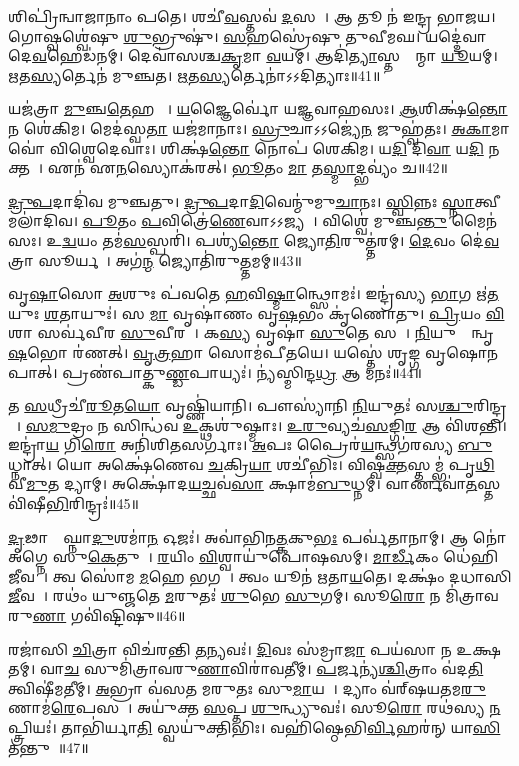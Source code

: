 𑌶𑌿𑌪𑍍𑌰𑌿॑𑌨𑍍𑌵𑌾𑌜𑌾𑌨𑌾𑌂 𑌪𑌤𑍇।
𑌶𑌚𑍀॑\ul{𑌵}𑌸𑍍𑌤𑌵॑ \ul{𑌦}\ul{}𑌸𑌨𑌾᳚।
𑌆 𑌤𑍂 𑌨॑ 𑌇𑌨𑍍𑌦𑍍𑌰 𑌭𑌾𑌜𑌯।
𑌗𑍋𑌷𑍍𑌵𑌶𑍍𑌵𑍇॑𑌷𑍁 \ul{𑌶𑍁}𑌭𑍍𑌰𑍁𑌷𑍁॑।
\ul{𑌸}𑌹𑌸𑍍𑌰𑍇॑𑌷𑍁 𑌤𑍁𑌵𑍀𑌮𑌘।
𑌯𑌦𑍍𑌦𑍇॑𑌵𑌾 𑌦𑍇\ul{𑌵}𑌹𑍇𑌡॑𑌨𑌮𑍍।
𑌦𑍇𑌵𑌾॑𑌸𑌶𑍍𑌚\ul{𑌕𑍃}𑌮𑌾 \ul{𑌵}𑌯𑌮𑍍।
𑌆𑌦𑌿॑\ul{𑌤𑍍𑌯𑌾}𑌸𑍍𑌤𑌸𑍍𑌮𑌾᳚𑌨𑍍𑌮𑌾 \ul{𑌯𑍂}𑌯𑌮𑍍।
\ul{𑌋}𑌤\ul{𑌸𑍍𑌯}𑌰𑍍𑌤𑍇𑌨॑ 𑌮𑍁𑌞𑍍𑌚𑌤।
\ul{𑌋}𑌤\ul{𑌸𑍍𑌯}𑌰𑍍𑌤𑍇𑌨𑌾॑𑌽𑌽𑌦𑌿𑌤𑍍𑌯𑌾𑌃॥41॥

𑌯𑌜॑𑌤𑍍𑌰𑌾 \ul{𑌮𑍁}𑌞𑍍𑌚\ul{𑌤𑍇}𑌹 𑌮𑌾᳚।
\ul{𑌯}𑌜𑍍𑌞𑍈𑌰𑍍𑌵𑍋॑ 𑌯𑌜𑍍𑌞𑌵𑌾𑌹𑌸𑌃।
\ul{𑌆}𑌶𑌿𑌕𑍍𑌷॑\ul{𑌨𑍍𑌤𑍋} 𑌨 𑌶𑍇॑𑌕𑌿𑌮।
𑌮𑍇𑌦॑𑌸𑍍𑌵\ul{𑌤𑌾} 𑌯𑌜॑𑌮𑌾𑌨𑌾𑌃।
\ul{𑌸𑍍𑌰𑍁}𑌚𑌾\-𑌽𑌽𑌜𑍍𑌯𑍇॑\ul{𑌨} 𑌜𑍁𑌹𑍍𑌵॑𑌤𑌃।
\ul{𑌅}\ul{𑌕𑌾}𑌮𑌾 𑌵𑍋॑ 𑌵𑌿𑌶𑍍𑌵𑍇𑌦𑍇𑌵𑌾𑌃।
𑌶𑌿𑌕𑍍𑌷॑\ul{𑌨𑍍𑌤𑍋} 𑌨𑍋𑌪॑ 𑌶𑍇𑌕𑌿𑌮।
𑌯\ul{𑌦𑌿} 𑌦𑌿\ul{𑌵𑌾} 𑌯\ul{𑌦𑌿} 𑌨𑌕𑍍𑌤𑌮𑍍᳚।
𑌏𑌨॑ 𑌏\ul{𑌨}𑌸𑍍𑌯𑍋𑌕॑𑌰𑌤𑍍।
\ul{𑌭𑍂}𑌤𑌂 \ul{𑌮𑌾} 𑌤\ul{𑌸𑍍𑌮𑌾}𑌦𑍍𑌭𑌵𑍍𑌯𑌂॑ 𑌚॥42॥

\ul{𑌦𑍍𑌰𑍁}\ul{𑌪}𑌦𑌾𑌦𑌿॑𑌵 𑌮𑍁𑌞𑍍𑌚𑌤𑍁।
\ul{𑌦𑍍𑌰𑍁}\ul{𑌪}𑌦𑌾\ul{𑌦𑌿}𑌵𑍇𑌨𑍍𑌮𑍁॑𑌮𑍁\ul{𑌚𑌾}𑌨𑌃।
\ul{𑌸𑍍𑌵𑌿}𑌨𑍍𑌨𑌃 \ul{𑌸𑍍𑌨𑌾}𑌤𑍍𑌵𑍀 𑌮𑌲𑌾॑𑌦𑌿𑌵।
\ul{𑌪𑍂}𑌤𑌂 \ul{𑌪}𑌵𑌿𑌤𑍍𑌰𑍇॑\ul{𑌣𑍇}𑌵𑌾𑌽𑌽𑌜𑍍𑌯𑌮𑍍᳚।
𑌵𑌿𑌶𑍍𑌵𑍇॑ 𑌮𑍁𑌞𑍍𑌚\ul{𑌨𑍍𑌤𑍁} 𑌮𑍈𑌨॑𑌸𑌃।
𑌉\ul{𑌦𑍍𑌵}𑌯𑌂 𑌤𑌮॑\ul{𑌸}𑌸𑍍𑌪𑌰𑌿॑।
𑌪𑌶𑍍𑌯॑\ul{𑌨𑍍𑌤𑍋} 𑌜𑍍𑌯𑍋\ul{𑌤𑌿}𑌰𑍁𑌤𑍍𑌤॑𑌰𑌮𑍍।
\ul{𑌦𑍇}𑌵𑌂 𑌦𑍇॑\ul{𑌵}𑌤𑍍𑌰𑌾 𑌸𑍂𑌰𑍍𑌯𑌮𑍍᳚।
𑌅𑌗॑\ul{𑌨𑍍𑌮} 𑌜𑍍𑌯𑍋𑌤𑌿॑𑌰𑍁\ul{𑌤𑍍𑌤}𑌮𑌮𑍍॥43॥\anuvakamend[𑌤𑌵॑ 𑌕𑍃\ul{𑌧𑌿} 𑌵\ul{𑌨}𑌸𑍍𑌪𑌤𑍀᳚𑌞𑍍𑌜𑌾𑌨\ul{𑌤𑌾}𑌮𑌸॑𑌤𑌿 \ul{𑌵}𑌯𑌂 𑌭॑𑌰𑌾𑌦𑌿𑌤𑍍𑌯𑌾\ul{𑌶𑍍𑌚} 𑌨𑌵॑ 𑌚]

𑌵𑍃\ul{𑌷𑌾}𑌸𑍋 \ul{𑌅}\ul{}𑌶𑍁𑌃 𑌪॑𑌵𑌤𑍇 \ul{𑌹}𑌵𑌿\ul{𑌷𑍍𑌮𑌾}𑌨𑍍𑌥𑍍𑌸𑍋𑌮𑌃॑।
𑌇𑌨𑍍𑌦𑍍𑌰॑𑌸𑍍𑌯 \ul{𑌭𑌾}𑌗 𑌋॑\ul{𑌤}𑌯𑍁𑌃 \ul{𑌶}𑌤𑌾𑌯𑍁𑌃॑।
𑌸 \ul{𑌮𑌾} 𑌵𑍃𑌷𑌾॑𑌣𑌂 𑌵𑍃\ul{𑌷}𑌭𑌂 𑌕𑍃॑𑌣𑍋𑌤𑍁।
\ul{𑌪𑍍𑌰𑌿}𑌯𑌂 \ul{𑌵𑌿}𑌶𑌾 𑌸𑌰𑍍𑌵॑𑌵𑍀𑌰 \ul{𑌸𑍁}𑌵𑍀𑌰𑌮𑍍᳚।
𑌕\ul{𑌸𑍍𑌯} 𑌵𑍃𑌷𑌾॑ \ul{𑌸𑍁}𑌤𑍇 𑌸𑌚𑌾᳚।
\ul{𑌨𑌿}𑌯𑍁𑌤𑍍𑌵𑌾᳚𑌨𑍍𑌵𑍃\ul{𑌷}𑌭𑍋 𑌰॑𑌣𑌤𑍍।
\ul{𑌵𑍃}\ul{𑌤𑍍𑌰}𑌹𑌾 𑌸𑍋𑌮॑𑌪𑍀𑌤𑌯𑍇।
𑌯𑌸𑍍𑌤𑍇॑ 𑌶𑍃𑌙𑍍𑌗 𑌵𑍃𑌷𑍋𑌨𑌪𑌾𑌤𑍍।
𑌪𑍍𑌰𑌣॑𑌪𑌾𑌤𑍍𑌕𑍁\ul{𑌣𑍍𑌡}𑌪𑌾𑌯𑍍𑌯𑌃॑।
𑌨𑍍𑌯॑𑌸𑍍𑌮𑌿𑌨𑍍𑌦\ul{𑌧𑍍𑌰} 𑌆 𑌮𑌨𑌃॑॥44॥

𑌤 \ul{𑌸}𑌧𑍍𑌰𑍀𑌚𑍀॑\ul{𑌰𑍂}𑌤\ul{𑌯𑍋} 𑌵𑍃𑌷𑍍𑌣𑌿॑𑌯𑌾𑌨𑌿।
𑌪𑍗𑌸𑍍𑌯𑌾॑𑌨𑌿 \ul{𑌨𑌿}𑌯𑍁𑌤𑌃॑ 𑌸\ul{𑌶𑍍𑌚𑍁}𑌰𑌿𑌨𑍍𑌦𑍍𑌰𑌮𑍍᳚।
\ul{𑌸}\ul{𑌮𑍁}𑌦𑍍𑌰𑌂 𑌨 𑌸𑌿𑌨𑍍𑌧॑𑌵 \ul{𑌉}𑌕𑍍𑌥𑌶𑍁॑𑌷𑍍𑌮𑌾𑌃।
\ul{𑌉}\ul{𑌰𑍁}𑌵𑍍𑌯𑌚॑\ul{𑌸}𑌙𑍍𑌗𑌿\ul{𑌰} 𑌆 𑌵𑌿॑𑌶𑌨𑍍𑌤𑌿।
𑌇𑌨𑍍𑌦𑍍𑌰𑌾॑\ul{𑌯} 𑌗𑌿\ul{𑌰𑍋} 𑌅𑌨𑌿॑𑌶𑌿𑌤𑌸𑌰𑍍𑌗𑌾𑌃।
\ul{𑌅}𑌪𑌃 𑌪𑍍𑌰𑍈𑌰॑\ul{𑌯}𑌨𑍍𑌥𑍍𑌸𑌗॑𑌰𑌸𑍍𑌯 \ul{𑌬𑍁}𑌧𑍍𑌨𑌾𑌤𑍍।
𑌯𑍋 𑌅𑌕𑍍𑌷𑍇॑𑌣𑍇𑌵 \ul{𑌚}𑌕𑍍𑌰𑌿\ul{𑌯𑌾} 𑌶𑌚𑍀॑𑌭𑌿𑌃।
𑌵𑌿𑌷𑍍𑌵॑\ul{𑌕𑍍𑌤}𑌸𑍍𑌤𑌮𑍍𑌭॑ 𑌪𑍃\ul{𑌥𑌿}𑌵𑍀\ul{𑌮𑍁}𑌤 𑌦𑍍𑌯𑌾𑌮𑍍।
𑌅𑌕𑍍𑌷𑍋॑𑌦\ul{𑌯}𑌚𑍍𑌛𑌵॑\ul{𑌸𑌾} 𑌕𑍍𑌷𑌾𑌮॑\ul{𑌬𑍁}𑌧𑍍𑌨𑌮𑍍।
𑌵𑌾𑌰𑍍𑌣𑌵𑌾॑\ul{𑌤}𑌸𑍍𑌤𑌵𑌿॑𑌷𑍀\ul{𑌭𑌿}𑌰𑌿𑌨𑍍𑌦𑍍𑌰𑌃॑॥45॥

\ul{𑌦𑍃}𑌢𑌾𑌨𑍍𑌯𑍗᳚𑌘𑍍𑌨𑌾\ul{𑌦𑍁}𑌶𑌮𑌾॑\ul{𑌨} 𑌓𑌜𑌃॑।
𑌅𑌵𑌾॑𑌭𑌿𑌨\ul{𑌤𑍍𑌕}𑌕𑍁\ul{𑌭𑌃} 𑌪𑌰𑍍𑌵॑𑌤𑌾𑌨𑌾𑌮𑍍।
𑌆 𑌨𑍋॑ 𑌅𑌗𑍍𑌨𑍇 𑌸𑍁\ul{𑌕𑍇}𑌤𑍁𑌨𑌾᳚।
\ul{𑌰}𑌯𑌿𑌂 \ul{𑌵𑌿}𑌶𑍍𑌵𑌾𑌯𑍁॑𑌪𑍋𑌷𑌸𑌮𑍍।
\ul{𑌮𑌾}\ul{𑌰𑍍𑌡𑍀}𑌕𑌂 𑌧𑍇॑𑌹𑌿 \ul{𑌜𑍀}𑌵𑌸𑍇᳚।
𑌤𑍍𑌵 𑌸𑍋॑𑌮 \ul{𑌮}𑌹𑍇 𑌭𑌗𑌮𑍍᳚।
𑌤𑍍𑌵𑌂 𑌯𑍂𑌨॑ 𑌋𑌤𑌾\ul{𑌯}𑌤𑍇।
𑌦𑌕𑍍𑌷𑌂॑ 𑌦𑌧𑌾𑌸𑌿 \ul{𑌜𑍀}𑌵𑌸𑍇᳚।
𑌰𑌥𑌂॑ 𑌯𑍁𑌞𑍍𑌜𑌤𑍇 \ul{𑌮}𑌰𑍁𑌤𑌃॑ \ul{𑌶𑍁}𑌭𑍇 \ul{𑌸𑍁}𑌗𑌮𑍍।
𑌸𑍂\ul{𑌰𑍋} 𑌨 𑌮𑌿॑𑌤𑍍𑌰𑌾𑌵𑌰𑍁\ul{𑌣𑌾} 𑌗𑌵𑌿॑𑌷𑍍𑌟𑌿𑌷𑍁॥46॥

𑌰𑌜𑌾॑𑌸𑌿 \ul{𑌚𑌿}𑌤𑍍𑌰𑌾 𑌵𑌿𑌚॑𑌰𑌨𑍍𑌤𑌿 \ul{𑌤}𑌨𑍍𑌯𑌵𑌃॑।
\ul{𑌦𑌿}𑌵𑌃 𑌸॑𑌮𑍍𑌰𑌾\ul{𑌜𑌾} 𑌪𑌯॑𑌸𑌾 𑌨 𑌉𑌕𑍍𑌷𑌤𑌮𑍍।
𑌵𑌾\ul{𑌚}\ul{} 𑌸𑍁𑌮𑌿॑𑌤𑍍𑌰𑌾𑌵𑌰𑍁\ul{𑌣𑌾}𑌵𑌿𑌰𑌾॑𑌵𑌤𑍀𑌮𑍍।
\ul{𑌪}𑌰𑍍𑌜𑌨𑍍𑌯॑\ul{𑌶𑍍𑌚𑌿}𑌤𑍍𑌰𑌾𑌂 𑌵॑𑌦\ul{𑌤𑌿} 𑌤𑍍𑌵𑌿𑌷𑍀॑𑌮𑌤𑍀𑌮𑍍।
\ul{𑌅}𑌭𑍍𑌰𑌾 𑌵॑𑌸𑌤 𑌮𑌰𑍁𑌤𑌃 𑌸𑍁\ul{𑌮𑌾}𑌯𑌯𑌾᳚।
𑌦𑍍𑌯𑌾𑌂 𑌵॑𑌰𑍍‌\mbox{}𑌷𑌯𑌤𑌮\ul{𑌰𑍁}𑌣𑌾𑌮॑\ul{𑌰𑍇}𑌪𑌸𑌮𑍍᳚।
𑌅𑌯𑍁॑𑌕𑍍𑌤 \ul{𑌸}𑌪𑍍𑌤 \ul{𑌶𑍁}𑌨𑍍𑌧𑍍𑌯𑍁𑌵𑌃॑।
𑌸𑍂\ul{𑌰𑍋} 𑌰𑌥॑𑌸𑍍𑌯 \ul{𑌨}𑌪𑍍𑌤𑍍𑌰𑌿𑌯𑌃॑।
𑌤𑌾𑌭𑌿॑𑌰𑍍𑌯𑌾\ul{𑌤𑌿} 𑌸𑍍𑌵𑌯𑍁॑𑌕𑍍𑌤𑌿𑌭𑌿𑌃।
𑌵𑌹𑌿॑𑌷𑍍𑌠𑍇𑌭𑌿\ul{𑌰𑍍𑌵𑌿}𑌹𑌰॑𑌨𑍍 𑌯𑌾\ul{𑌸𑌿} 𑌤𑌨𑍍𑌤𑍁𑌮𑍍᳚॥47॥

